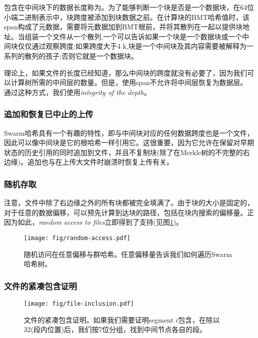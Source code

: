 包含在中间块下的数据长度称为。为了能够判断一个块是否是一个数据块，在64位小端二进制表示中，块跨度被添加到块数据之前。在计算块的BMT哈希值时，该span构成了元数据，需要将元数据加到BMT根前，并将其散列在一起以提供块地址。当组装一个文件从一个散列,一个可以告诉如果一个块是一个数据块或一个中间块仅仅通过观察跨度:如果跨度大于4 k,块是一个中间块及其内容需要被解释为一系列的散列的孩子;否则它就是一个数据块。

理论上，如果文件的长度已经知道，那么中间块的跨度就没有必要了，因为我们可以计算树所需的中间层的数量。但是，使用span不允许将中间层恢复为数据层。通过这种方式，我们使用\emph{integrity of the depth}。 

\subsubsection{追加和恢复已中止的上传}

Swarm哈希具有一个有趣的特性，即与中间块对应的任何数据跨度也是一个文件，因此可以像中间块是它的根哈希一样引用它。这很重要，因为它允许在保留对早期状态的历史引用的同时追加到文件，并且不复制块(除了在Merkle树的不完整的右边缘)。追加也与在上传大文件时崩溃时恢复上传有关。

\subsubsection{随机存取}

注意，文件中除了右边缘之外的所有块都被完全填满了。由于块的大小是固定的，对于任意的数据偏移，可以预先计算到达块的路径，包括在块内搜索的偏移量。正因为如此，\emph{random access to files}立即得到了支持(见图\ref{fig:random-access})。


\begin{figure}[htbp]
\centering
\texttt{[image: fig/random-access.pdf]}
\caption[随机访问在任意偏移量与群哈希\statusgreen]{随机访问在任意偏移与群哈希。任意偏移量告诉我们如何遍历Swarm哈希树。}
\label{fig:random-access}
\end{figure}

\subsubsection{文件的紧凑包含证明}


\begin{figure}[htbp]
\centering
\texttt{[image: fig/file-inclusion.pdf]}
\caption[压缩包含证明文件\statusgreen]{文件的紧凑包含证明。如果我们需要证明segment $i$包含，在除以32(段内位置)后，我们按7位分组，找到中间节点各自的段。}
\label{fig:file-inclusion}
\end{figure}


